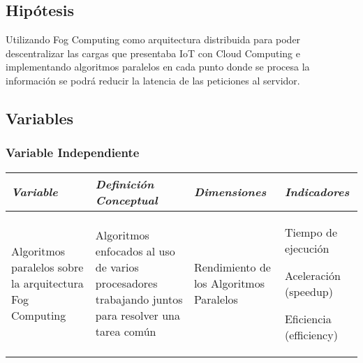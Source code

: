     \subsection{Hipótesis}
        Utilizando Fog Computing como arquitectura distribuida para poder descentralizar las cargas que presentaba IoT con Cloud Computing e implementando algoritmos paralelos en cada punto donde se procesa la información se podrá reducir la latencia de las peticiones al servidor.\par
    \subsection{Variables}
        \subsubsection{Variable Independiente}
            \begin{table}[h!]
                \centering
                \begin{tabular}{|p{3cm}|p{3cm}|p{3cm}|p{3cm}|} \hline
                    
                
                \textit{{\bf{Variable}}} &
                \textit{{\bf{Definición Conceptual}}} &
                \textit{{\bf{Dimensiones}}} &
                \textit{{\bf{Indicadores}}}
                \\ \hline

                Algoritmos paralelos sobre la arquitectura Fog Computing &
                Algoritmos enfocados al uso de varios procesadores trabajando juntos para resolver una tarea común &
                Rendimiento de los Algoritmos Paralelos &
                Tiempo de ejecución \par
                Aceleración (speedup) \par
                Eficiencia (efficiency) \par

                \\ \hline

                \end{tabular}
            \end{table}
